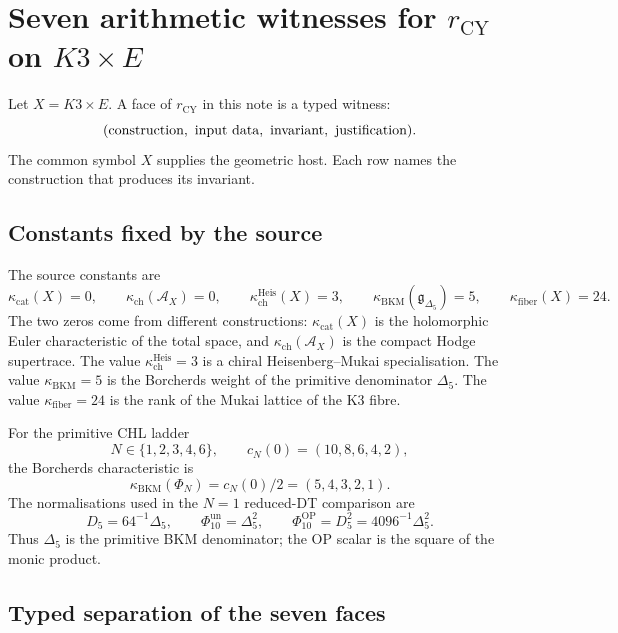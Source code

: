 \providecommand{\kBKM}{\kappa_{\mathrm{BKM}}}
\providecommand{\kch}{\kappa_{\mathrm{ch}}}
\providecommand{\kcat}{\kappa_{\mathrm{cat}}}
\providecommand{\kfib}{\kappa_{\mathrm{fiber}}}
\providecommand{\SpCh}{\mathrm{Sp}^{\mathrm{ch}}}
\providecommand{\PhiFA}{\Phi^{\mathrm{FA}}}
\providecommand{\Eone}{E_1}
\providecommand{\Etwo}{E_2}
\providecommand{\Ethree}{E_3}
\providecommand{\cA}{\mathcal{A}}
\providecommand{\cC}{\mathcal{C}}
\providecommand{\cO}{\mathcal{O}}
\providecommand{\rCY}{r_{\mathrm{CY}}}
\providecommand{\ZZ}{\mathbb{Z}}

\section{Seven arithmetic witnesses for $\rCY$ on $K3\times E$}
\label{rcy:sec:seven-arithmetic-witnesses}

Let $X=K3\times E$.  A face of $\rCY$ in this note is a typed
witness:
\[
(\hbox{construction},\ \hbox{input data},\ \hbox{invariant},\
\hbox{justification}).
\]
The common symbol $X$ supplies the geometric host.  Each row names the
construction that produces its invariant.

\subsection{Constants fixed by the source}
\label{rcy:subsec:constants}

The source constants are
\[
\kcat(X)=0,\qquad
\kch(\cA_X)=0,\qquad
\kch^{\mathrm{Heis}}(X)=3,\qquad
\kBKM(\mathfrak g_{\Delta_5})=5,\qquad
\kfib(X)=24.
\]
The two zeros come from different constructions: $\kcat(X)$ is the
holomorphic Euler characteristic of the total space, and
$\kch(\cA_X)$ is the compact Hodge supertrace.  The value
$\kch^{\mathrm{Heis}}=3$ is a chiral Heisenberg--Mukai
specialisation.  The value $\kBKM=5$ is the Borcherds weight of the
primitive denominator $\Delta_5$.  The value $\kfib=24$ is the rank of
the Mukai lattice of the K3 fibre.

For the primitive CHL ladder
\[
N\in\{1,2,3,4,6\},\qquad
c_N(0)=(10,8,6,4,2),
\]
the Borcherds characteristic is
\[
\kBKM(\Phi_N)=c_N(0)/2=(5,4,3,2,1).
\]
The normalisations used in the $N=1$ reduced-DT comparison are
\[
D_5=64^{-1}\Delta_5,\qquad
\Phi_{10}^{\mathrm{un}}=\Delta_5^2,\qquad
\Phi_{10}^{\mathrm{OP}}=D_5^2=4096^{-1}\Delta_5^2.
\]
Thus $\Delta_5$ is the primitive BKM denominator; the OP scalar is the
square of the monic product.

\subsection{Typed separation of the seven faces}
\label{rcy:subsec:typed-separation}

